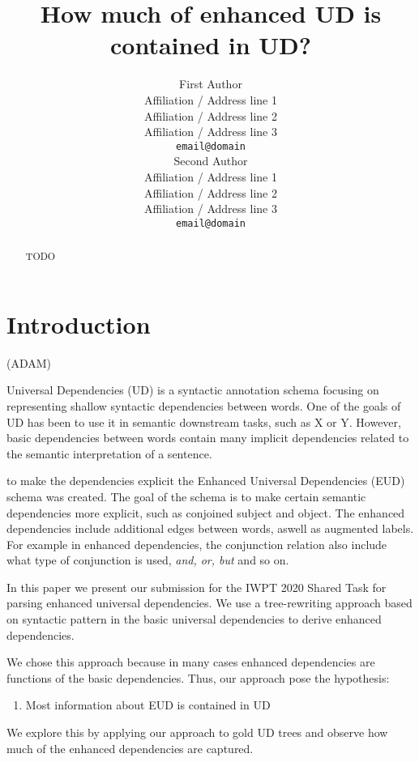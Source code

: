 \documentclass[11pt,a4paper]{article}
\title{How much of enhanced UD is contained in UD?}
\author{First Author \\
  Affiliation / Address line 1 \\
  Affiliation / Address line 2 \\
  Affiliation / Address line 3 \\
  \texttt{email@domain} \\\And
  Second Author \\
  Affiliation / Address line 1 \\
  Affiliation / Address line 2 \\
  Affiliation / Address line 3 \\
  \texttt{email@domain} \\}
\date{}
\begin{document}
\maketitle
\begin{abstract}
  TODO
\end{abstract}

\section{Introduction}
(ADAM)

Universal Dependencies (UD) is a syntactic annotation schema
focusing on representing shallow syntactic dependencies between
words. One of the goals of UD has been to use it in semantic
downstream tasks, such as X or Y. However, basic dependencies
between words contain many implicit dependencies related to the
semantic interpretation of a sentence.

to make the dependencies explicit the Enhanced Universal
Dependencies (EUD) schema was created. The goal of the schema is
to make certain semantic dependencies more explicit, such as
conjoined subject and object. The enhanced dependencies include
additional edges between words, aswell as augmented labels. For
example in enhanced dependencies, the conjunction relation also
include what type of conjunction is used, \textit{and, or, but}
and so on.

In this paper we present our submission for the IWPT 2020 Shared
Task for parsing enhanced universal dependencies. We use a
tree-rewriting approach based on syntactic pattern in the basic
universal dependencies to derive enhanced dependencies.


    
We chose this approach because in many cases enhanced dependencies
are functions of the basic dependencies. Thus, our approach pose
the hypothesis:
\begin{enumerate}
    \item Most information about EUD is contained in UD
\end{enumerate}


    
We explore this by applying our approach to gold UD trees and
observe how much of the enhanced dependencies are captured.

    
   
\end{document}
